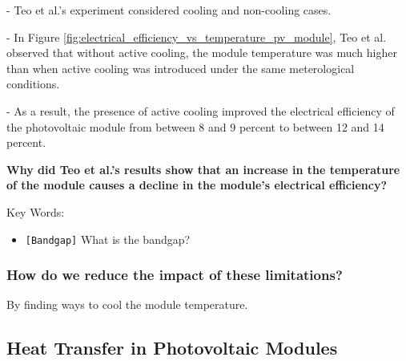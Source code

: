 \noindent - Teo et al.'s \cite{Teo2012AnModules} experiment considered cooling and non-cooling cases.\par
\noindent - In Figure \ref{fig:electrical_efficiency_vs_temperature_pv_module}, Teo et al. observed that without active cooling, the module temperature was much higher than when active cooling was introduced under the same meterological conditions.\par
\noindent - As a result, the presence of active cooling improved the electrical efficiency of the photovoltaic module from between 8 and 9 percent to between 12 and 14 percent.\vspace{1em}

\noindent\textbf{Why did Teo et al.'s results show that an increase in the temperature of the module causes a decline in the module's electrical efficiency?}\par

\noindent Key Words:\par
\begin{itemize}
    \item \texttt{[Bandgap]} What is the bandgap?
\end{itemize}


\subsubsection{How do we reduce the impact of these limitations?}
By finding ways to cool the module temperature.\par

\pagebreak
\subsection{Heat Transfer in Photovoltaic Modules}

